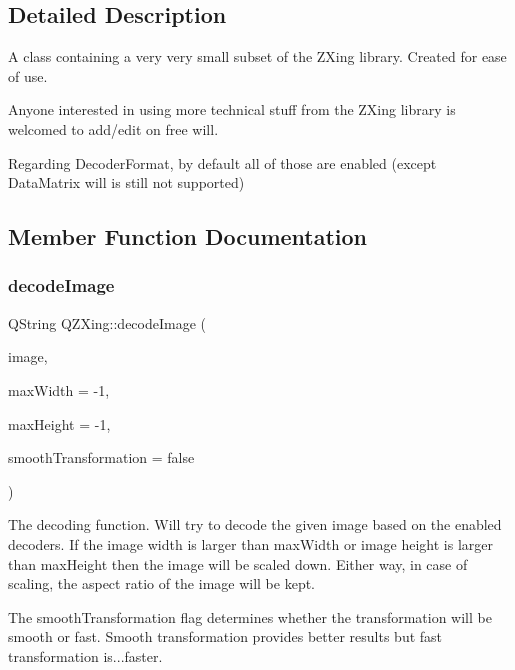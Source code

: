 \subsection{Detailed Description}
A class containing a very very small subset of the Z\+Xing library. Created for ease of use.

Anyone interested in using more technical stuff from the Z\+Xing library is welcomed to add/edit on free will.

Regarding Decoder\+Format, by default all of those are enabled (except Data\+Matrix will is still not supported) 

\subsection{Member Function Documentation}
\mbox{\label{class_q_z_xing_a21f75bdef7ecd2100ed170e1b32470a7}} 
\subsubsection{\texorpdfstring{decode\+Image}{decodeImage}}
{\footnotesize\ttfamily Q\+String Q\+Z\+Xing\+::decode\+Image (\begin{DoxyParamCaption}\item[{const Q\+Image \&}]{image,  }\item[{int}]{max\+Width = {\ttfamily -\/1},  }\item[{int}]{max\+Height = {\ttfamily -\/1},  }\item[{bool}]{smooth\+Transformation = {\ttfamily false} }\end{DoxyParamCaption})\hspace{0.3cm}{\ttfamily [slot]}}

The decoding function. Will try to decode the given image based on the enabled decoders. If the image width is larger than max\+Width or image height is larger than max\+Height then the image will be scaled down. Either way, in case of scaling, the aspect ratio of the image will be kept.

The smooth\+Transformation flag determines whether the transformation will be smooth or fast. Smooth transformation provides better results but fast transformation is...faster. \mbox{\label{class_q_z_xing_a8e2119732a304523033fe5fd8505c4e9}} 
